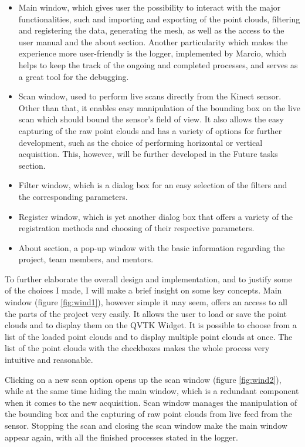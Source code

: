 \documentclass[aps,letterpaper,11pt]{revtex4}
\begin{document}
\begin{itemize}
\item Main window, which gives user the possibility to interact with the major functionalities, such and importing and exporting of the point clouds, filtering and registering the data, generating the mesh, as well as the access to the user manual and the about section. Another particularity which makes the experience more user-friendly is the logger, implemented by Marcio, which helps to keep the track of the ongoing and completed processes, and serves as a great tool for the debugging. 
\item Scan window, used to perform live scans directly from the Kinect sensor. Other than that, it enables easy manipulation of the bounding box on the live scan which should bound the sensor’s field of view. It also allows the easy capturing of the raw point clouds and has a variety of options for further development, such as the choice of performing horizontal or vertical acquisition. This, however, will be further developed in the Future tasks section. 
\item Filter window, which is a dialog box for an easy selection of the filters and the corresponding parameters. 
\item Register window, which is yet another dialog box that offers a variety of the registration methods and choosing of their respective parameters. 
\item About section, a pop-up window with the basic information regarding the project, team members, and mentors.
\end{itemize}\par
To further elaborate the overall design and implementation, and to justify some of the choices I made, I will make a brief insight on some key concepts. Main window (figure \ref {fig:wind1}), however simple it may seem, offers an access to all the parts of the project very easily. It allows the user to load or save the point clouds and to display them on the QVTK Widget. It is possible to choose from a list of the loaded point clouds and to display multiple point clouds at once. The list of the point clouds with the checkboxes makes the whole process very intuitive and reasonable. \par
Clicking on a new scan option opens up the scan window (figure \ref {fig:wind2}), while at the same time hiding the main window, which is a redundant component when it comes to the new acquisition. Scan window manages the manipulation of the bounding box and the capturing of raw point clouds from live feed from the sensor. Stopping the scan and closing the scan window make the main window appear again, with all the finished processes stated in the logger.\par
\end{document}
